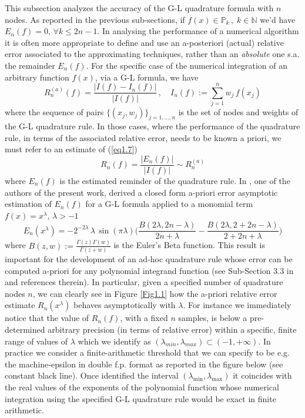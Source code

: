 \documentclass[a4paper, twosided]{book}
\begin{document}
This subsection analyzes the accuracy of the G-L quadrature formula with $n$ nodes. As reported in the previous sub-sections, if $f(x)\in\mathbb{P}_k\,,\;k\in\mathbb{N}$ we'd have $E_n(f)=0,\,\forall k\leq2n-1$.  
In analysing the performance of a numerical algorithm it is often more appropriate to define and use an a-posteriori (actual) relative error associated to the approximating techniques, rather than an {\itshape absolute} one s.a. the remainder $E_n(f)$. For the specific case of the numerical integration of an arbitrary function $f(x)$, via a G-L formula, we have
\begin{equation}\label{eq1.7}
    R_n^{(a)}(f) = \frac{|I(f)-I_n(f)|}{|I(f)|}\,,\quad I_n(f):=\sum_{j=1}^{n}w_j\,f(x_j)
\end{equation}
\noindent
where the sequence of pairs $\{(x_j,w_j)\}_{j=1,...,n}$ is the set of nodes and weights of the G-L quadrature rule. In those cases, where the performance of the quadrature rule, in terms of the associated relative error, needs to be known a priori, we must refer to an estimate of (\ref{eq1.7}) 
\begin{equation}\label{eq1.8}
    R_n(f) = \frac{|E_n(f)|}{|I(f)|} \sim R_n^{(a)}
\end{equation}
where $E_n(f)$ is the estimated reminder of the quadrature rule. In \cite{Lombardi09}, one of the authors of the present work, derived a closed form a-priori error asymptotic estimation of $E_n(f)$ for a G-L formula applied to a monomial term $f(x)=x^\lambda,\, \lambda>-1$
\begin{equation}\label{eq1.9}
    E_n(x^\lambda) = -2^{-2\lambda}\,\lambda\,\sin(\pi \lambda) \bigg(\frac{B(2\lambda,2n-\lambda)}{2n+\lambda} - \frac{B(2\lambda, 2+2n-\lambda)}{2+2n+\lambda}\bigg)
\end{equation}
\noindent
where $B(z,w):=\frac{\Gamma(z)\Gamma(w)}{\Gamma(z+w)}$ is the Euler's Beta function. This result is important for the development of an ad-hoc quadrature rule whose error can be computed a-priori for any polynomial integrand function (see Sub-Section 3.3 in \cite{Lombardi21} and references therein). In particular, given a specified number of quadrature nodes $n$, we can clearly see in Figure \ref{Fig1.1} how the a-priori relative error estimate $R_n(x^\lambda)$ behaves asymptotically with $\lambda$. For instance we immediately notice that the value of $R_n(f)$, with a fixed $n$ samples, is below a pre-determined arbitrary precision (in terms of relative error) within a specific, finite range of values of $\lambda$ which we identify as $(\lambda_{min},\lambda_{max})\subset(-1,+\infty)$. In practice we consider a finite-arithmetic threshold that we can specify to be e.g. the machine-epsilon in double f.p. format as reported in the figure below (see constant black line). Once identified the interval $(\lambda_{\text{min}}, \lambda_{\text{max}})$ it coincides with the real values of the exponents of the polynomial function whose numerical integration using the specified G-L quadrature rule would be exact in finite arithmetic.
\end{document}
